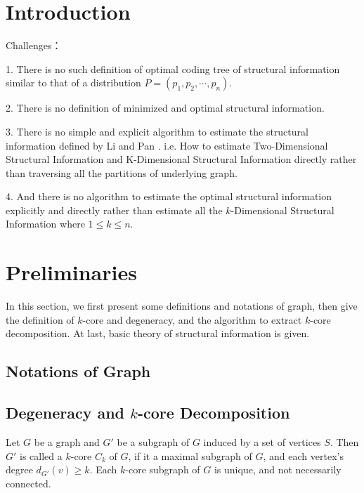 \documentclass[10pt, conference, letterpaper]{IEEEtran}
\begin{document}
\section{Introduction}

Challenges：

1. There is no such definition of optimal coding tree of structural information similar to that of a distribution $P=(p_1, p_2, \cdots, p_n)$. 

2. There is no definition of minimized and optimal structural information.

3. There is no simple and explicit algorithm to estimate the structural information defined by Li and Pan \cite{li2016}. i.e. How to estimate Two-Dimensional Structural Information and K-Dimensional Structural Information directly rather than traversing all the partitions of underlying graph.

4. And there is no algorithm to estimate the optimal structural information explicitly and directly rather than estimate all the $k$-Dimensional Structural Information where $1 \leq k \leq n$.


\section{Preliminaries}\label{sec:preliminaries}

In this section, we first present some definitions and notations of graph, then give the definition of $k$-core and degeneracy, and the algorithm to extract $k$-core decomposition. At last, basic theory of structural information is given.
\subsection{Notations of Graph}\label{subsec:notations}




\subsection{Degeneracy and $k$-core Decomposition}
\label{subsec:k-core}
Let $G$ be a graph and $G'$ be a subgraph of $G$ induced by a set of vertices $S$. Then $G'$ is called a $k$-core $C_k$ of $G$, if it a maximal subgraph of $G$, and each vertex's degree $d_{G'}(v) \geq k$. Each $k$-core subgraph of $G$ is unique, and not necessarily connected.
\end{document}
